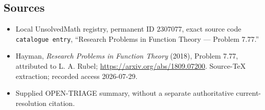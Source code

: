 \documentclass[11pt]{article}
\begin{document}
\subsection{Sources}
\begin{itemize}
\item Local UnsolvedMath registry, permanent ID \(2307077\), exact source code \texttt{catalogue entry}, ``Research Problems in Function Theory --- Problem 7.77.''
\item Hayman, \emph{Research Problems in Function Theory} (2018), Problem 7.77, attributed to L. A. Rubel; \url{https://arxiv.org/abs/1809.07200}. Source-TeX extraction; recorded access 2026-07-29.
\item Supplied OPEN-TRIAGE summary, without a separate authoritative current-resolution citation.
\end{itemize}
\end{document}
